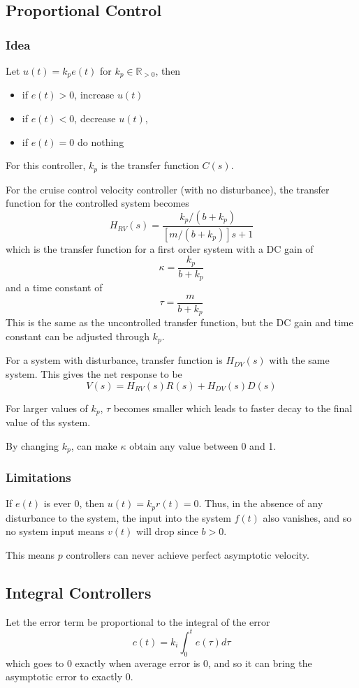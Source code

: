 \documentclass[11pt]{article}
\begin{document}
\subsection{Proportional Control}
\label{sec:org54bd376}
\subsubsection{Idea}
\label{sec:org6b57088}
Let \(u(t) = k_{p} e(t)\) for \(k_{p} \in \mathbb{R}_{>0}\), then
\begin{itemize}
\item if \(e(t) > 0\), increase \(u(t)\)
\item if \(e(t) < 0\), decrease \(u(t)\),
\item if \(e(t) = 0\) do nothing
\end{itemize}

For this controller, \(k_{p}\) is the transfer function \(C(s)\).

For the cruise control velocity controller (with no disturbance),
the transfer function for the controlled system becomes
$$
H_{RV}(s) = \frac{k_{p}/(b + k_{p})}{[m/(b+k_{p})]s + 1}
$$
which is the transfer function for a first order system with a DC gain of
$$
\kappa = \frac{k_{p}}{b + k_{p}}
$$
and a time constant of
$$
\tau = \frac{m}{b + k_{p}}
$$
This is the same as the uncontrolled transfer function, but the DC gain and time
constant can be adjusted through \(k_{p}\).

For a system with disturbance, transfer function is \(H_{DV}(s)\) with the
same system.
This gives the net response to be
$$
V(s) = H_{RV}(s) R(s) + H_{DV}(s) D(s)
$$

For larger values of \(k_{p}\), \(\tau\) becomes smaller which leads to faster decay to
the final value of ths system.

By changing \(k_{p}\), can make \(\kappa\) obtain any value between 0 and 1.
\subsubsection{Limitations}
\label{sec:org1ca87a3}
If \(e(t)\) is ever 0, then \(u(t) = k_{p}r(t) = 0\).
Thus, in the absence of any disturbance to the system, the input into the system
\(f(t)\) also vanishes, and so no system input means \(v(t)\) will drop since \(b > 0\).

This means \(p\) controllers can never achieve perfect asymptotic velocity.
\subsection{Integral Controllers}
\label{sec:org505bbf7}
Let the error term be proportional to the integral of the error
$$
c(t) = k_{i} \int_{0}^{t} e(\tau) d\tau
$$
which goes to 0 exactly when average error is 0, and so it can bring the asymptotic
error to exactly 0.
\end{document}
